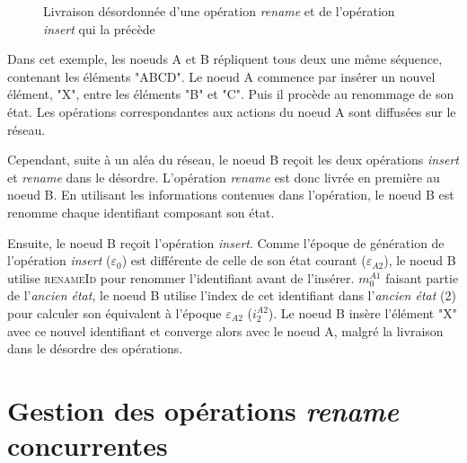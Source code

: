 \documentclass[12pt]{thesul}
\newcommand{\trm}[1]{\mathit{#1}}
\newcommand{\id}[3]{$\trm{#1}^{\trm{#2}}_{\trm{#3}}$}
\newcommand{\epoch}[1]{$\varepsilon_{#1}$}
\begin{document}
\begin{figure}[!ht]
{
  }
  \caption{Livraison désordonnée d'une opération \emph{rename} et de l'opération \emph{insert} qui la précède}
  \label{fig:rls-out-of-order-rename}
\end{figure}

Dans cet exemple, les noeuds A et B répliquent tous deux une même séquence, contenant les éléments "ABCD".
Le noeud A commence par insérer un nouvel élément, "X", entre les éléments "B" et "C".
Puis il procède au renommage de son état.
Les opérations correspondantes aux actions du noeud A sont diffusées sur le réseau.

Cependant, suite à un aléa du réseau, le noeud B reçoit les deux opérations \emph{insert} et \emph{rename} dans le désordre.
L'opération \emph{rename} est donc livrée en première au noeud B.
En utilisant les informations contenues dans l'opération, le noeud B est renomme chaque identifiant composant son état.

Ensuite, le noeud B reçoit l'opération \emph{insert}.
Comme l'époque de génération de l'opération \emph{insert} (\epoch{0}) est différente de celle de son état courant (\epoch{A2}), le noeud B utilise \textsc{renameId} pour renommer l'identifiant avant de l'insérer.
\id{m}{A1}{0} faisant partie de l'\emph{ancien état}, le noeud B utilise l'index de cet identifiant dans l'\emph{ancien état} (2) pour calculer son équivalent à l'époque \epoch{A2} (\id{i}{A2}{2}).
Le noeud B insère l'élément "X" avec ce nouvel identifiant et converge alors avec le noeud A, malgré la livraison dans le désordre des opérations.

\section{Gestion des opérations \emph{rename} concurrentes}
\label{sec:distributed-rls}
\end{document}
